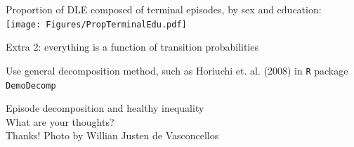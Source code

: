 \documentclass[20pt,usenames,dvipsnames]{beamer}
\begin{document}
\begin{frame}[plain]
\Large
\vspace{1em}
\begin{center}
Proportion of DLE composed of terminal episodes, by sex and education:\vspace{-1em}
\texttt{[image: Figures/PropTerminalEdu.pdf]}
\end{center}
\end{frame}

\begin{frame}[plain]
\Large
\begin{center}
Extra 2: everything is a function of transition probabilities

\vspace{1em}
\pause
Use general decomposition method, such as Horiuchi et. al. (2008) in \texttt{R} package \texttt{DemoDecomp}
\end{center}
\end{frame}


\begin{frame}[plain]
\Large
\centering
Episode decomposition and healthy inequality\\ What are your thoughts?\\ \vspace{1em}Thanks!
\tiny
\flushright
\vspace{13cm}
   Photo by Willian Justen de Vasconcellos
\end{frame}
\end{document}
